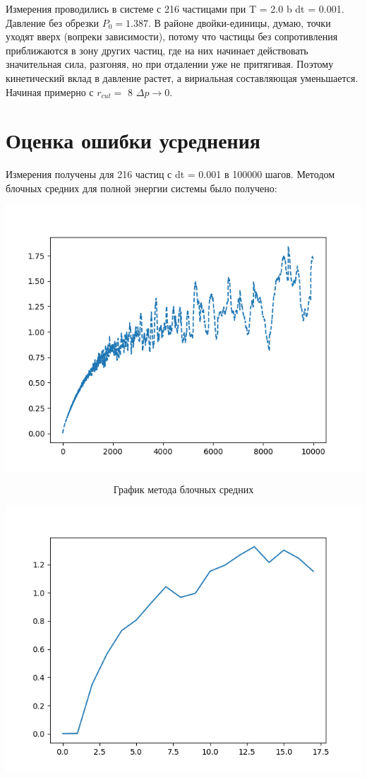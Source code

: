 \documentclass[a4paper, 12pt]{article}
\begin{document}
Измерения проводились в системе с 216 частицами при T = 2.0 b dt = 0.001. Давление без обрезки $P_0 = 1.387$. В районе двойки-единицы, думаю, точки уходят вверх (вопреки зависимости), потому что частицы без сопротивления приближаются в зону других частиц, где на них начинает действовать значительная сила, разгоняя, но при отдалении уже не притягивая. Поэтому кинетический вклад в давление растет, а вириальная составляющая уменьшается. Начиная примерно с $r_{cut} = $ 8 $\Delta p \rightarrow 0$.

\part{Оценка ошибки усреднения}
Измерения получены для 216 частиц с dt = 0.001 в 100000 шагов. Методом блочных средних для полной энергии системы было получено:
\begin{center}
\includegraphics[scale=0.8]{err}
\end{center}
\[\textit{График метода блочных средних}\]
\begin{center}
\includegraphics[scale=0.8]{err2}
\end{center}
\end{document}
